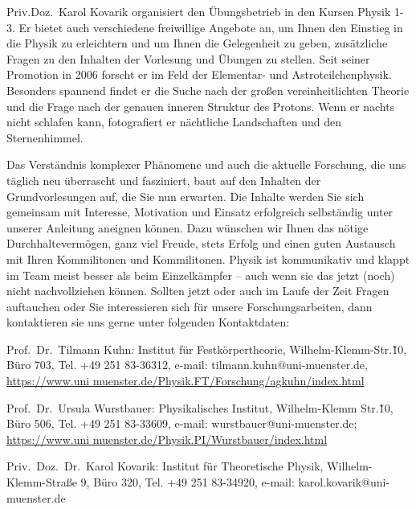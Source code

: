 \begin{multicols}{2}
Priv.\-Doz.\ Karol Kovarik organisiert den Übungsbetrieb in den Kursen Physik 1-3. Er bietet auch 
verschiedene freiwillige Angebote an, um Ihnen den Einstieg in die Physik zu erleichtern und um Ihnen 
die Gelegenheit zu geben, zusätzliche Fragen zu den Inhalten der Vorlesung und Übungen zu stellen. 
Seit seiner Promotion in 2006 forscht er im Feld der Elementar- und Astroteilchenphysik. Besonders 
spannend findet er die Suche nach der großen vereinheitlichten Theorie und die Frage nach der 
genauen inneren Struktur des Protons. Wenn er nachts nicht schlafen kann, fotografiert er nächtliche 
Landschaften und den Sternenhimmel. 

Das Verständnis komplexer Phänomene und auch die aktuelle Forschung, die uns täglich neu 
überrascht und fasziniert, baut auf den Inhalten der Grundvorlesungen auf, die Sie nun erwarten. Die 
Inhalte werden Sie sich gemeinsam mit Interesse, Motivation und Einsatz erfolgreich selbständig unter 
unserer Anleitung aneignen können. Dazu wünschen wir Ihnen das nötige Durchhaltevermögen, ganz 
viel Freude, stets Erfolg und einen guten Austausch mit Ihren Kommilitonen und Kommilitonen. Physik 
ist kommunikativ und klappt im Team meist besser als beim Einzelkämpfer – auch wenn sie das jetzt (noch) 
nicht nachvollziehen können. Sollten jetzt oder auch im Laufe der Zeit Fragen auftauchen oder Sie 
interessieren sich für unsere Forschungsarbeiten, dann kontaktieren sie uns gerne unter folgenden 
Kontaktdaten: 

Prof.\ Dr.\ Tilmann Kuhn: Institut für Festkörpertheorie, Wilhelm-Klemm-Str.\~10, Büro 703, Tel. +49 
251 83-36312, e-mail: tilmann.kuhn@uni-muenster.de, \url{https://www.uni
muenster.de/Physik.FT/Forschung/agkuhn/index.html}

Prof.\ Dr.\ Ursula Wurstbauer: Physikalisches Institut, Wilhelm-Klemm Str.\~10, Büro 506, Tel. +49 251 
83-33609, e-mail: wurstbauer@uni-muenster.de; \url{https://www.uni
muenster.de/Physik.PI/Wurstbauer/index.html}

Priv.\ Doz.\ Dr.\ Karol Kovarik: Institut für Theoretische Physik, Wilhelm-Klemm-Straße 9, Büro 320, Tel. 
+49 251 83-34920, e-mail: karol.kovarik@uni-muenster.de

\end{multicols}
